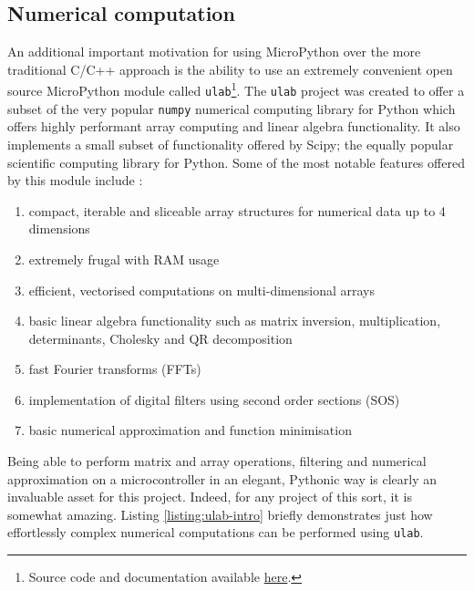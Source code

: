 \subsection{Numerical computation}
An additional important motivation for using MicroPython over the more traditional C/C++ approach is the ability to use an extremely convenient open source MicroPython module called \texttt{ulab}\footnote{Source code and documentation available \href{https://github.com/v923z/micropython-ulab}{here}.}. The \texttt{ulab} project was created to offer a subset of the very popular \texttt{numpy} numerical computing library for Python which offers highly performant array computing and linear algebra functionality. It also implements a small subset of functionality offered by Scipy; the equally popular scientific computing library for Python. Some of the most notable features offered by this module include \cite{ulab}:
\begin{enumerate}
    \item compact, iterable and sliceable array structures for numerical data up to 4 dimensions
    \item extremely frugal with RAM usage
    \item efficient, vectorised computations on multi-dimensional arrays
    \item basic linear algebra functionality such as matrix inversion, multiplication, determinants, Cholesky and QR decomposition
    \item fast Fourier transforms (FFTs)
    \item implementation of digital filters using second order sections (SOS)
    \item basic numerical approximation and function minimisation
\end{enumerate}
Being able to perform matrix and array operations, filtering and numerical approximation on a microcontroller in an elegant, Pythonic way is clearly an invaluable asset for this project. Indeed, for any project of this sort, it is somewhat amazing. Listing \ref{listing:ulab-intro} briefly demonstrates just how effortlessly complex numerical computations can be performed using \texttt{ulab}.

